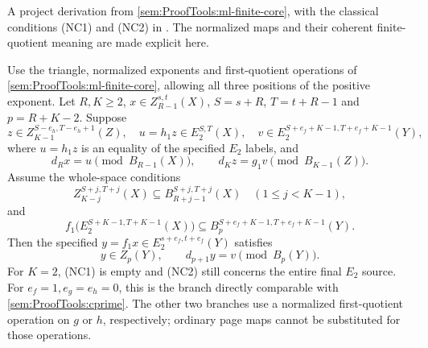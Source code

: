 \begin{theorem}
\label{sem:ProofTools:ml-classical-nc}
A project derivation from \ref{sem:ProofTools:ml-finite-core}, with the
classical conditions (NC1) and (NC2) in \cite[Section 2]{MLConditions1020}.
The normalized maps and their coherent finite-quotient meaning are made
explicit here.\par
Use the triangle, normalized exponents and first-quotient operations of
\ref{sem:ProofTools:ml-finite-core}, allowing all three positions of the
positive exponent. Let $R,K\geq2$, $x\in Z_{R-1}^{s,t}(X)$,
$S=s+R$, $T=t+R-1$ and $p=R+K-2$. Suppose
\[
 z\in Z_{K-1}^{S-e_h,T-e_h+1}(Z),\quad
 u=h_1z\in E_2^{S,T}(X),\quad
 v\in E_2^{S+e_f+K-1,T+e_f+K-1}(Y),
\]
where $u=h_1z$ is an equality of the specified $E_2$ labels, and
\[
 d_Rx=u\pmod{B_{R-1}(X)},\qquad
 d_Kz=g_1v\pmod{B_{K-1}(Z)}.
\]
Assume the whole-space conditions
\[
 Z_{K-j}^{S+j,T+j}(X)\subseteq B_{R+j-1}^{S+j,T+j}(X)
 \quad(1\leq j<K-1),
\tag{NC1}
\]
and
\[
 f_1\bigl(E_2^{S+K-1,T+K-1}(X)\bigr)
 \subseteq B_p^{S+e_f+K-1,T+e_f+K-1}(Y).
\tag{NC2}
\]
Then the specified $y=f_1x\in E_2^{s+e_f,t+e_f}(Y)$ satisfies
\[
 y\in Z_p(Y),\qquad d_{p+1}y=v\pmod{B_p(Y)}.
\]
For $K=2$, (NC1) is empty and (NC2) still concerns the entire final
$E_2$ source. For $e_f=1,e_g=e_h=0$, this is the branch directly
comparable with \ref{sem:ProofTools:cprime}. The other two branches use
a normalized first-quotient operation on $g$ or $h$, respectively;
ordinary page maps cannot be substituted for those operations.
\end{theorem}
